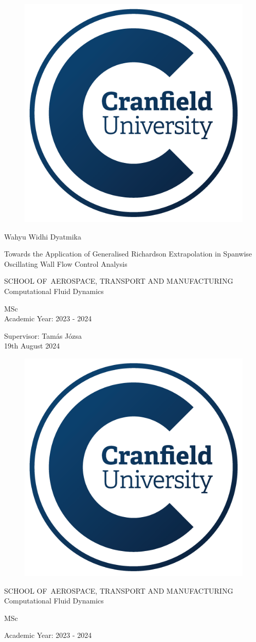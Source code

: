{  \makeatletter
    \centering\Large\singlespacing%
    \pagestyle{empty}%
    \begin{figure}[H]
    \centering
    \includegraphics[width=0.3\linewidth]{Figures/CULogo.png}
    \label{fig:lOGO}
\end{figure}

    \par
    Wahyu Widhi Dyatmika\par
    \vfill
    Towards the Application of Generalised Richardson Extrapolation in Spanwise Oscillating Wall Flow Control Analysis\par
    \vfill%
    SCHOOL OF~\MakeUppercase{AEROSPACE, TRANSPORT AND
MANUFACTURING}\\%
    Computational Fluid Dynamics\par%
    \vfill
    MSc\\
     Academic Year: 2023 - 2024\par
   \vfill
   Supervisor: Tamás Józsa\\%
   19th August 2024\par
    \vfill\null\cleardoublepage
    \centering\Large%
    \pagestyle{empty}
    \begin{figure}[H]
    \centering
    \includegraphics[width=0.3\linewidth]{Figures/CULogo.png}
    \label{fig:culogo}
\end{figure}
\par
    \vfill%
    SCHOOL OF~\MakeUppercase{AEROSPACE, TRANSPORT AND
MANUFACTURING}\\%
    Computational Fluid Dynamics\par%
    \vfill
    MSc\par%
    \vfill
    Academic Year: 2023 - 2024\par%
}
